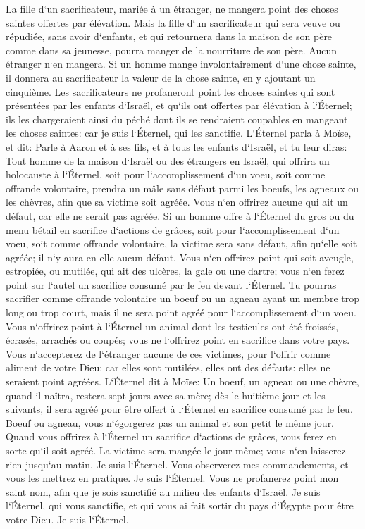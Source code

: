 \verse La fille d`un sacrificateur, mariée à un étranger, ne mangera point des choses saintes offertes par élévation. 
\verse Mais la fille d`un sacrificateur qui sera veuve ou répudiée, sans avoir d`enfants, et qui retournera dans la maison de son père comme dans sa jeunesse, pourra manger de la nourriture de son père. Aucun étranger n`en mangera. 
\verse Si un homme mange involontairement d`une chose sainte, il donnera au sacrificateur la valeur de la chose sainte, en y ajoutant un cinquième. 
\verse Les sacrificateurs ne profaneront point les choses saintes qui sont présentées par les enfants d`Israël, et qu`ils ont offertes par élévation à l`Éternel; 
\verse ils les chargeraient ainsi du péché dont ils se rendraient coupables en mangeant les choses saintes: car je suis l`Éternel, qui les sanctifie. 
\verse L`Éternel parla à Moïse, et dit: 
\verse Parle à Aaron et à ses fils, et à tous les enfants d`Israël, et tu leur diras: Tout homme de la maison d`Israël ou des étrangers en Israël, qui offrira un holocauste à l`Éternel, soit pour l`accomplissement d`un voeu, soit comme offrande volontaire, 
\verse prendra un mâle sans défaut parmi les boeufs, les agneaux ou les chèvres, afin que sa victime soit agréée. 
\verse Vous n`en offrirez aucune qui ait un défaut, car elle ne serait pas agréée. 
\verse Si un homme offre à l`Éternel du gros ou du menu bétail en sacrifice d`actions de grâces, soit pour l`accomplissement d`un voeu, soit comme offrande volontaire, la victime sera sans défaut, afin qu`elle soit agréée; il n`y aura en elle aucun défaut. 
\verse Vous n`en offrirez point qui soit aveugle, estropiée, ou mutilée, qui ait des ulcères, la gale ou une dartre; vous n`en ferez point sur l`autel un sacrifice consumé par le feu devant l`Éternel. 
\verse Tu pourras sacrifier comme offrande volontaire un boeuf ou un agneau ayant un membre trop long ou trop court, mais il ne sera point agréé pour l`accomplissement d`un voeu. 
\verse Vous n`offrirez point à l`Éternel un animal dont les testicules ont été froissés, écrasés, arrachés ou coupés; vous ne l`offrirez point en sacrifice dans votre pays. 
\verse Vous n`accepterez de l`étranger aucune de ces victimes, pour l`offrir comme aliment de votre Dieu; car elles sont mutilées, elles ont des défauts: elles ne seraient point agréées. 
\verse L`Éternel dit à Moïse: 
\verse Un boeuf, un agneau ou une chèvre, quand il naîtra, restera sept jours avec sa mère; dès le huitième jour et les suivants, il sera agréé pour être offert à l`Éternel en sacrifice consumé par le feu. 
\verse Boeuf ou agneau, vous n`égorgerez pas un animal et son petit le même jour. 
\verse Quand vous offrirez à l`Éternel un sacrifice d`actions de grâces, vous ferez en sorte qu`il soit agréé. 
\verse La victime sera mangée le jour même; vous n`en laisserez rien jusqu`au matin. Je suis l`Éternel. 
\verse Vous observerez mes commandements, et vous les mettrez en pratique. Je suis l`Éternel. 
\verse Vous ne profanerez point mon saint nom, afin que je sois sanctifié au milieu des enfants d`Israël. Je suis l`Éternel, qui vous sanctifie, 
\verse et qui vous ai fait sortir du pays d`Égypte pour être votre Dieu. Je suis l`Éternel. 


